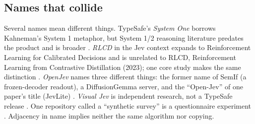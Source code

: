 \subsection{Names that collide}

Several names mean different things. TypeSafe's \emph{System One} borrows Kahneman's System 1 metaphor, but System 1/2 reasoning literature predates the product and is broader \citep{arxiv2502_17419}. \emph{RLCD} in the Jev context expands to Reinforcement Learning for Calibrated Decisions and is unrelated to RLCD, Reinforcement Learning from Contrastive Distillation (2023); one core study makes the same distinction \citep{arxiv2609_24574}. \emph{OpenJev} names three different things: the former name of SemIf (a frozen-decoder readout), a DiffusionGemma server, and the “Open-Jev” of one paper's title (JevLite) \citep{gh_theoleecj_semif,gh_razorback16_openjev,arxiv2609_23959}. \emph{Visual Jev} is independent research, not a TypeSafe release \citep{arxiv2609_25845}. One repository called a “synthetic survey” is a questionnaire experiment \citep{gh_jjd_lab_jev_synthetic_survey}. Adjacency in name implies neither the same algorithm nor copying.
